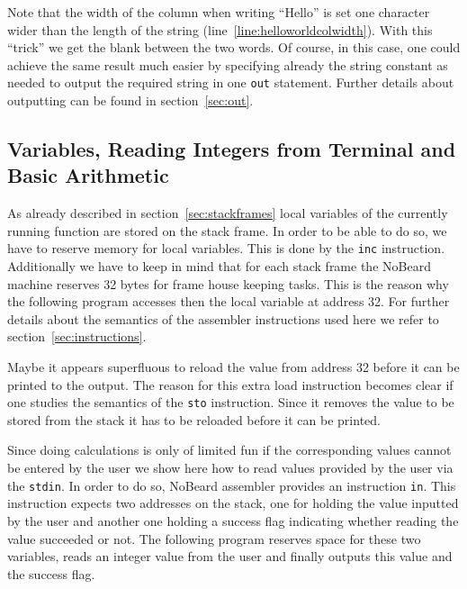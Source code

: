 \documentclass[11pt]{report}
\newcommand{\leongage}{NoBeard}
\begin{document}


Note that the width of the column when writing ``Hello'' is set one character wider than the length of the string (line~\ref{line:helloworldcolwidth}). With this ``trick'' we get the blank between the two words. Of course, in this case, one could achieve the same result much easier by specifying already the string constant as needed to output the required string in one \lstinline$out$ statement. Further details about outputting can be found in section~\ref{sec:out}.

\subsection{Variables, Reading Integers from Terminal and Basic Arithmetic}
As already described in section~\ref{sec:stackframes} local variables of the currently running function are stored on the stack frame. In order to be able to do so, we have to reserve memory for local variables. This is done by the \lstinline$inc$ instruction. Additionally we have to keep in mind that for each stack frame the \leongage{} machine reserves 32 bytes for frame house keeping tasks. This is the reason why the following program accesses then the local variable at address 32. For further details about the semantics of the assembler instructions used here we refer to section~\ref{sec:instructions}.



Maybe it appears superfluous to reload the value from address 32 before it can be printed to the output. The reason for this extra load instruction becomes clear if one studies the semantics of the \lstinline$sto$ instruction. Since it removes the value to be stored from the stack it has to be reloaded before it can be printed.

Since doing calculations is only of limited fun if the corresponding values cannot be entered by the user we show here how to read values provided by the user via the \lstinline$stdin$. In order to do so, \leongage{} assembler provides an instruction \lstinline$in$. This instruction expects two addresses on the stack, one for holding the value inputted by the user and another one holding a success flag indicating whether reading the value succeeded or not. The following program reserves space for these two variables, reads an integer value from the user and finally outputs this value and the success flag.
\end{document}
